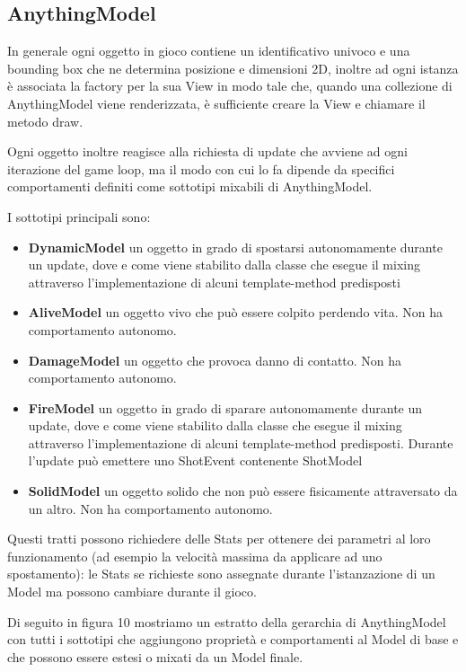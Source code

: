 \subsection{AnythingModel}
In generale ogni oggetto in gioco contiene un identificativo univoco e una bounding box che ne determina posizione e dimensioni 2D, inoltre ad ogni istanza è associata la factory per la sua View in modo tale che, quando una collezione di AnythingModel viene renderizzata, è sufficiente creare la View e chiamare il metodo draw. 

Ogni oggetto inoltre reagisce alla richiesta di update che avviene ad ogni iterazione del game loop, ma il modo con cui lo fa dipende da specifici comportamenti definiti come sottotipi mixabili di AnythingModel.

I sottotipi principali sono:
\begin{itemize}
    \item \textbf{DynamicModel} un oggetto in grado di spostarsi autonomamente durante un update, dove e come viene stabilito dalla classe che esegue il mixing attraverso l'implementazione di alcuni template-method predisposti
    \item \textbf{AliveModel} un oggetto vivo che può essere colpito perdendo vita. Non ha comportamento autonomo.
    \item \textbf{DamageModel} un oggetto che provoca danno di contatto. Non ha comportamento autonomo.
    \item \textbf{FireModel} un oggetto in grado di sparare autonomamente durante un update, dove e come viene stabilito dalla classe che esegue il mixing attraverso l'implementazione di alcuni template-method predisposti. Durante l'update può emettere uno ShotEvent contenente ShotModel
    \item \textbf{SolidModel} un oggetto solido che non può essere fisicamente attraversato da un altro. Non ha comportamento autonomo.
\end{itemize}

Questi tratti possono richiedere delle Stats per ottenere dei parametri al loro funzionamento (ad esempio la velocità massima da applicare ad uno spostamento): le Stats se richieste sono assegnate durante l'istanzazione di un Model ma possono cambiare durante il gioco.

Di seguito in figura 10 mostriamo un estratto della gerarchia di AnythingModel con tutti i sottotipi che aggiungono proprietà e comportamenti al Model di base e che possono essere estesi o mixati da un Model finale.


